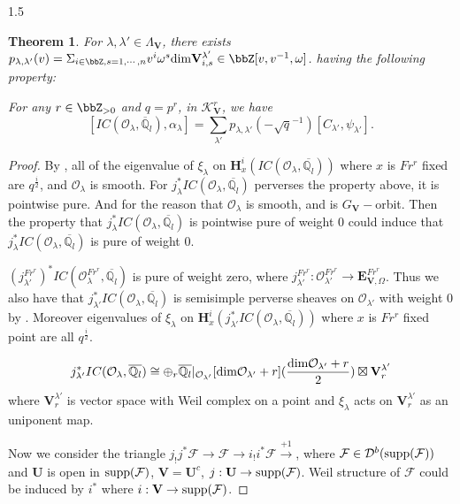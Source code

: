 \documentclass[10pt]{amsart}
\newtheorem{thm}{Theorem}
\def\dim{\mbox{\rm dim}}   \def\End{\mbox{\rm End}}
\def\bfV{{\mathbf V}}
\def\bfH{{\mathbf H}} \def\bfP{{\mathbf P}} \def\bfa{{\bf a}}
\def\supp{{\rm supp}}
\def\bfV{\mathbf{V}}
\def\bfE{\mathbf{E}}
\def\bfU{\mathbf{U}}
\newcommand\bbq{{\mathbb Q}}
\newcommand\mk{{\mathcal{K}}}
\newcommand\mf{{\mathcal{F}}}
\newcommand\mo{{\mathcal{O}}}
\begin{document}
\begin{spacing}{1.5}
\begin{thm}\label{theorem}
For $\lambda,\lambda'\in \Lambda_{\bfV}$, there exists $p_{\lambda,\lambda'}(v)=\Sigma_{i\in \bbZ,s=1,\cdots ,n}v^{i}\omega^s \dim \bfV^{\lambda'}_{i,s}\in \bbZ[v,v^{-1},\omega]$. having the following property:

For any $r\in \bbZ_{>0}$ and $q=p^r$, in $\mk^r_{\bfV}$, we have
$$
[IC(\mathcal{O}_{\lambda}, \overline{\mathbb{Q}}_l), \alpha_{\lambda}] = \sum_{\lambda'} p_{\lambda, \lambda'}(-\sqrt{q}^{-1}) [C_{\lambda'}, \psi_{\lambda'}].
$$

\end{thm}

\begin{proof}
    

By \cite[Corollary 10.7]{lusztig1990canonical}, all of the eigenvalue of $\xi_{\lambda}$ on $\bfH^i_x(IC(\mo_{\lambda},\overline{\bbq_l}))$ where $x$ is $Fr^r$ fixed are $q^{\frac{i}{2}}$, and $\mo_{\lambda}$ is smooth. For $j_{\lambda}^*IC(\mo_{\lambda},\overline{\bbq_l})$ perverses the property above, it is pointwise pure. And for the reason that $\mo_{\lambda}$ is smooth, and is $G_{\bfV}-$orbit. Then the property that $j_{\lambda}^*IC(\mo_{\lambda},\overline{\bbq_l})$ is pointwise pure of weight 0 could induce that $j_{\lambda}^*IC(\mo_{\lambda},\overline{\bbq_l})$ is pure of weight 0.

 $(j_{\lambda'}^{Fr^r})^*IC(\mo_{\lambda}^{Fr^r},\overline{\bbq_l})$ is pure of weight zero, where $j_{\lambda'}^{Fr^r}:\mo_{\lambda'}^{Fr^r}\rightarrow \bfE_{\bfV,\Omega}^{Fr^r}$. Thus we also have that $j_{\lambda'}^*IC(\mo_{\lambda},\overline{\bbq_l})$ is semisimple perverse sheaves on $\mo_{\lambda'}$ with weight 0 by \cite{BBD}. Moreover eigenvalues of $\xi_{\lambda}$ on $\bfH^i_x(j_{\lambda'}^*IC(\mo_{\lambda},\overline{\bbq_l}))$ where $x$ is $Fr^r$ fixed point are all $q^{\frac{i}{2}}$. 

$$j_{\lambda'}^*IC(\mo_{\lambda},\overline{\bbq_l})\cong \oplus_r \overline{\bbq_{l}}|_{\mo_{\lambda'}}[\dim \mo_{\lambda'}+r](\frac{\dim \mo_{\lambda'}+r}{2})\boxtimes \bfV^{\lambda'}_r$$ where $\bfV^{\lambda'}_r$ is vector space with Weil complex on a point and $\xi_{\lambda}$ acts on $\bfV^{\lambda'}_r$ as an uniponent map.

Now we consider the triangle $j_!j^*\mf\rightarrow \mf \rightarrow i_!i^*\mf\xrightarrow{+1}$, where $\mf\in \mathcal{D}^{b}(\supp(\mf))$ and $\bfU$ is open in $\supp(\mf)$, $\bfV=\bfU^c$, $j:\bfU\rightarrow \supp(\mf)$. Weil structure of $\mf$ could be induced by $i^*$ where $i: \bfV\rightarrow \supp(\mf)$.


\end{proof}
\end{spacing}
\end{document}
